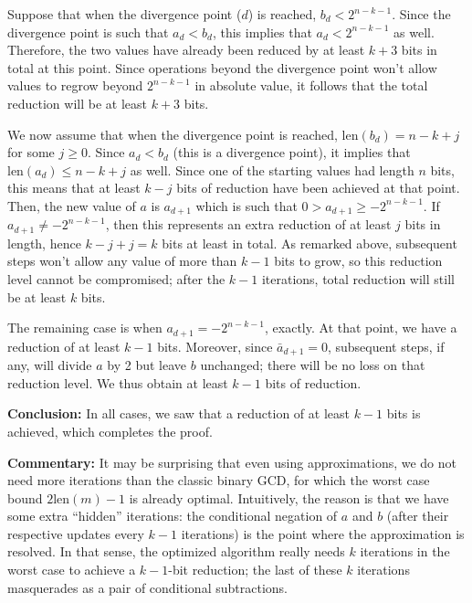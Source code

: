 \documentclass{llncs}
\newcommand{\bitlength}{\text{len}}
\begin{document}
Suppose that when the divergence point ($d$) is reached,
$b_d < 2^{n-k-1}$. Since the divergence point is such that $a_d < b_d$,
this implies that $a_d < 2^{n-k-1}$ as well. Therefore, the two values
have already been reduced by at least $k+3$ bits in total at this
point. Since operations beyond the divergence point won't allow values
to regrow beyond $2^{n-k-1}$ in absolute value, it follows that the
total reduction will be at least $k+3$ bits.

We now assume that when the divergence point is reached,
$\bitlength(b_d) = n - k + j$ for some $j\geq 0$. Since $a_d < b_d$
(this is a divergence point), it implies that $\bitlength(a_d) \leq n -
k + j$ as well. Since one of the starting values had length $n$ bits,
this means that at least $k - j$ bits of reduction have been achieved at
that point. Then, the new value of $a$ is $a_{d+1}$ which is such that
$0 > a_{d+1} \geq -2^{n-k-1}$. If $a_{d+1} \neq -2^{n-k-1}$, then this
represents an extra reduction of at least $j$ bits in length, hence $k -
j + j = k$ bits at least in total. As remarked above, subsequent steps
won't allow any value of more than $k-1$ bits to grow, so this reduction
level cannot be compromised; after the $k-1$ iterations, total reduction
will still be at least $k$ bits.

The remaining case is when $a_{d+1} = -2^{n-k-1}$, exactly. At that
point, we have a reduction of at least $k - 1$ bits. Moreover, since
$\bar a_{d+1} = 0$, subsequent steps, if any, will divide $a$ by 2
but leave $b$ unchanged; there will be no loss on that reduction
level. We thus obtain at least $k-1$ bits of reduction.

\vspace{2ex}
\noindent\textsf{\textbf{Conclusion:}} In all cases, we saw that
a reduction of at least $k-1$ bits is achieved, which completes the proof.

\vspace{2ex}
\noindent\textsf{\textbf{Commentary:}} It may be surprising that even
using approximations, we do not need more iterations than the classic
binary GCD, for which the worst case bound $2\bitlength(m)-1$ is already
optimal. Intuitively, the reason is that we have some extra ``hidden''
iterations: the conditional negation of $a$ and $b$ (after their
respective updates every $k-1$ iterations) is the point where the
approximation is resolved. In that sense, the optimized algorithm really
needs $k$ iterations in the worst case to achieve a $k-1$-bit reduction;
the last of these $k$ iterations masquerades as a pair of conditional
subtractions.
\end{document}
